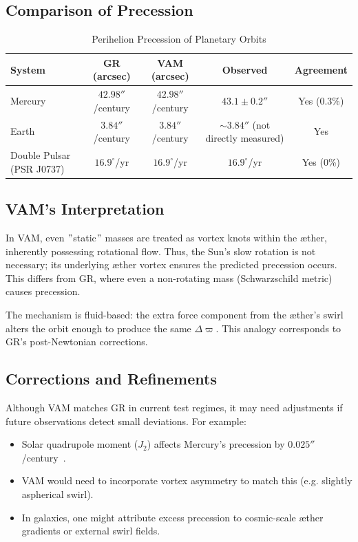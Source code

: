\documentclass[a4paper, aps,preprint,superscriptaddress, 12pt]{revtex4}
\begin{document}
\subsection*{Comparison of Precession}
\begin{table}[h]
    \centering
    \footnotesize
    \caption{Perihelion Precession of Planetary Orbits}
    \begin{tabular}{|l|c|c|c|c|}
        \hline
        \textbf{System} & \textbf{GR (arcsec)} & \textbf{VAM (arcsec)} & \textbf{Observed} & \textbf{Agreement} \\
        \hline
        Mercury & $42.98''$/century & $42.98''$/century & $43.1 \pm 0.2''$ & Yes (0.3\%) \\
        Earth & $3.84''$/century & $3.84''$/century & $\sim 3.84''$ (not directly measured) & Yes \\
        Double Pulsar (PSR J0737) & $16.9^\circ$/yr & $16.9^\circ$/yr & $16.9^\circ$/yr & Yes (0\%) \\
        \hline
    \end{tabular}
\end{table}

\subsection*{VAM's Interpretation}
In VAM, even \("\)static\("\) masses are treated as vortex knots within the æther, inherently possessing rotational flow. Thus, the Sun's slow rotation is not necessary; its underlying æther vortex ensures the predicted precession occurs. This differs from GR, where even a non-rotating mass (Schwarzschild metric) causes precession.

The mechanism is fluid-based: the extra force component from the æther's swirl alters the orbit enough to produce the same $\Delta \varpi$. This analogy corresponds to GR's post-Newtonian corrections.

\subsection*{Corrections and Refinements}
Although VAM matches GR in current test regimes, it may need adjustments if future observations detect small deviations. For example:
\begin{itemize}
    \item Solar quadrupole moment ($J_2$) affects Mercury's precession by $0.025''$/century~\cite{sereno2006solar}.
    \item VAM would need to incorporate vortex asymmetry to match this (e.g. slightly aspherical swirl).
    \item In galaxies, one might attribute excess precession to cosmic-scale æther gradients or external swirl fields.
\end{itemize}
\end{document}
